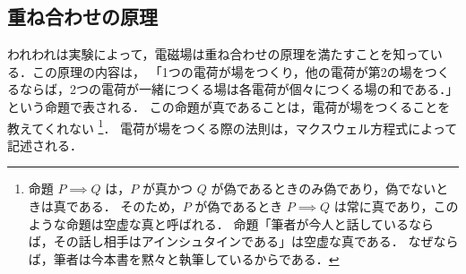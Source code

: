 \documentclass[11pt, a4paper]{ltjsarticle}
\numberwithin{equation}{section}
\begin{document}
\subsection{重ね合わせの原理}
われわれは実験によって，電磁場は重ね合わせの原理を満たすことを知っている．この原理の内容は，
「1つの電荷が場をつくり，他の電荷が第2の場をつくるならば，2つの電荷が一緒につくる場は各電荷が個々につくる場の和である．」
という命題で表される．
この命題が真であることは，電荷が場をつくることを教えてくれない
\footnote{命題 $P \implies Q$ は，$P$ が真かつ $Q$ が偽であるときのみ偽であり，偽でないときは真である．
そのため，$P$ が偽であるとき $P \implies Q$ は常に真であり，このような命題は空虚な真と呼ばれる．
命題「筆者が今人と話しているならば，その話し相手はアインシュタインである」は空虚な真である．
なぜならば，筆者は今本書を黙々と執筆しているからである．}．
電荷が場をつくる際の法則は，マクスウェル方程式によって記述される．
\end{document}
